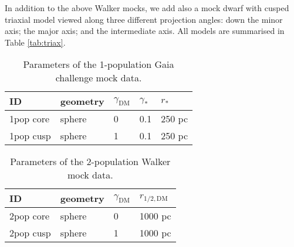 In addition to the above Walker mocks, we add also a mock dwarf with
cusped triaxial model viewed along three different projection angles:
down the minor axis; the major axis; and the intermediate axis. All
models are summarised in Table \ref{tab:triax}.

\begin{table}
    \label{tab:gaia}
    \caption{Parameters of the 1-population Gaia challenge mock data.}
    \centering
    \begin{tabular}{lllll}
        ID & geometry & $\gamma_{\text{DM}}$ & $\gamma_*$ & $r_*$\\
        \hline
        1pop core & sphere & 0 & 0.1 & 250 pc\\ %
        1pop cusp & sphere & 1 & 0.1 & 250 pc\\ %
    \end{tabular}
\end{table}

\begin{table}
    \label{tab:walk}
    \caption{Parameters of the 2-population Walker mock data.}
    \centering
    \begin{tabular}{llll}
        ID & geometry & $\gamma_{\text{DM}}$ & $r_{1/2,\text{DM}}$\\
        \hline
        2pop core & sphere & 0 & 1000 pc \\              %
        2pop cusp & sphere & 1 & 1000 pc\\\hline\hline   %
    \end{tabular}
\end{table}


